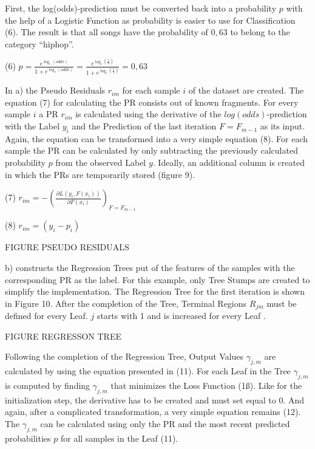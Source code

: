 First, the log(odds)-prediction must be converted back into a probability \(p\) with the help of a 
Logistic Function as probability is easier to use for Classification (6). The result is 
that all songs have the probability of \(0,63\) to belong to the category “hiphop”.

(6) \(p = \frac{e^{\log_{e}(odds)}}{1 + e^{\log_{e}(odds)}} = \frac{e^{\log_{e}(\frac{5}{3})}}{1 + e^{\log_{e}(\frac{5}{3})}} = 0,63\)

In a) the Pseudo Residuals \(r_{im}\) for each sample \(i\) of the dataset are created. The equation (7) 
for calculating the PR consists out of known fragments. For every sample \(i\) a PR \(r_{im}\) 
is calculated using the derivative of the \(log(odds)\)-prediction with the Label \(y_{i}\) and the 
Prediction of the last iteration \(F = F_{m - 1}\) as its input. Again, the equation can be 
transformed into a very simple equation (8). For each sample the PR can be calculated by only 
subtracting the previously calculated probability \(p\) from the observed Label \(y\). Ideally, an additional 
column is created in which the PRs are temporarily stored (figure 9). 

(7) \(r_{im} = - (\frac{\partial L(y_{i}, F(x_{i}))}{\partial F(x_{i})})_{F = F_{m - 1}} \)

(8) \(r_{im} = (y_{i} - p_{i})\)

FIGURE PSEUDO RESIDUALS 

b) constructs the Regression Trees put of the features of the samples with the corresponding 
PR as the label. For this example, only Tree Stumps are created to simplify the implementation. 
The Regression Tree for the first iteration is shown in Figure 10. After the completion of the 
Tree, Terminal Regions \(R_{jm}\) must be defined for every Leaf. \(j\) starts with 1 and is increased for 
every Leaf \cite[p.1195]{Friedman_2001}. 

FIGURE REGRESSON TREE 

Following the completion of the Regression Tree, Output Values \(\gamma_{j, m}\) are calculated by using 
the equation presented in (11). For each Leaf in the Tree \(\gamma_{j, m}\) is computed by finding 
\(\gamma_{j, m}\) that minimizes the Loss Function (1ß). Like for the initialization step, the derivative has 
to be created and must set equal to \(0\). And again, after a complicated transformation, a very simple 
equation remains (12). The \(\gamma_{j, m}\)  can be calculated using only the PR and the most 
recent predicted probabilities \(p\) for all samples in the Leaf (11). 

